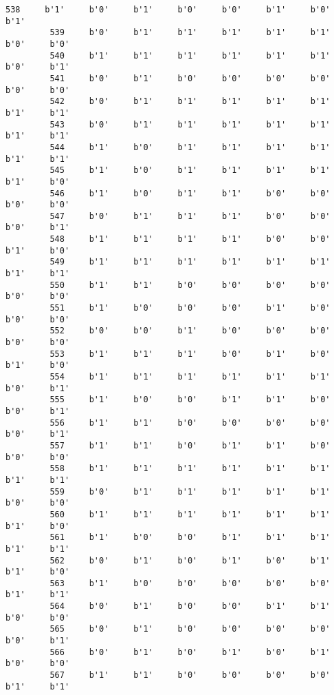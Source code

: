 \documentclass[11pt]{article}
\begin{document}
\begin{Verbatim}[commandchars=\\\{\}]
         538     b'1'     b'0'     b'1'     b'0'     b'0'     b'1'     b'0'     b'1'   
         539     b'0'     b'1'     b'1'     b'1'     b'1'     b'1'     b'0'     b'0'   
         540     b'1'     b'1'     b'1'     b'1'     b'1'     b'1'     b'0'     b'1'   
         541     b'0'     b'1'     b'0'     b'0'     b'0'     b'0'     b'0'     b'0'   
         542     b'0'     b'1'     b'1'     b'1'     b'1'     b'1'     b'1'     b'1'   
         543     b'0'     b'1'     b'1'     b'1'     b'1'     b'1'     b'1'     b'1'   
         544     b'1'     b'0'     b'1'     b'1'     b'1'     b'1'     b'1'     b'1'   
         545     b'1'     b'0'     b'1'     b'1'     b'1'     b'1'     b'1'     b'0'   
         546     b'1'     b'0'     b'1'     b'1'     b'0'     b'0'     b'0'     b'0'   
         547     b'0'     b'1'     b'1'     b'1'     b'0'     b'0'     b'0'     b'1'   
         548     b'1'     b'1'     b'1'     b'1'     b'0'     b'0'     b'1'     b'0'   
         549     b'1'     b'1'     b'1'     b'1'     b'1'     b'1'     b'1'     b'1'   
         550     b'1'     b'1'     b'0'     b'0'     b'0'     b'0'     b'0'     b'0'   
         551     b'1'     b'0'     b'0'     b'0'     b'1'     b'0'     b'0'     b'0'   
         552     b'0'     b'0'     b'1'     b'0'     b'0'     b'0'     b'0'     b'0'   
         553     b'1'     b'1'     b'1'     b'0'     b'1'     b'0'     b'1'     b'0'   
         554     b'1'     b'1'     b'1'     b'1'     b'1'     b'1'     b'0'     b'1'   
         555     b'1'     b'0'     b'0'     b'1'     b'1'     b'0'     b'0'     b'1'   
         556     b'1'     b'1'     b'0'     b'0'     b'0'     b'0'     b'0'     b'1'   
         557     b'1'     b'1'     b'0'     b'1'     b'1'     b'0'     b'0'     b'0'   
         558     b'1'     b'1'     b'1'     b'1'     b'1'     b'1'     b'1'     b'1'   
         559     b'0'     b'1'     b'1'     b'1'     b'1'     b'1'     b'0'     b'0'   
         560     b'1'     b'1'     b'1'     b'1'     b'1'     b'1'     b'1'     b'0'   
         561     b'1'     b'0'     b'0'     b'1'     b'1'     b'1'     b'1'     b'1'   
         562     b'0'     b'1'     b'0'     b'1'     b'0'     b'1'     b'1'     b'0'   
         563     b'1'     b'0'     b'0'     b'0'     b'0'     b'0'     b'1'     b'1'   
         564     b'0'     b'1'     b'0'     b'0'     b'1'     b'1'     b'0'     b'0'   
         565     b'0'     b'1'     b'0'     b'0'     b'0'     b'0'     b'0'     b'1'   
         566     b'0'     b'1'     b'0'     b'1'     b'0'     b'1'     b'0'     b'0'   
         567     b'1'     b'1'     b'0'     b'0'     b'0'     b'0'     b'1'     b'1'   

\end{Verbatim}
\end{document}
